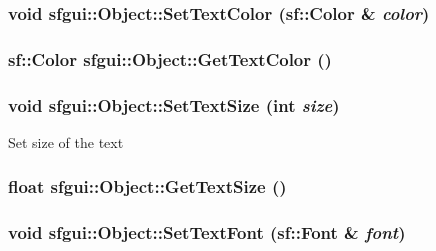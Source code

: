 \hypertarget{classsfgui_1_1Object_88f1c97f50dd466417309f0776dce452}{
\subsubsection[SetTextColor]{\setlength{\rightskip}{0pt plus 5cm}void sfgui::Object::SetTextColor (sf::Color \& {\em color})}}
\label{classsfgui_1_1Object_88f1c97f50dd466417309f0776dce452}


\hypertarget{classsfgui_1_1Object_df734af2a7ca4ad600fe8bff51ed06cc}{
\subsubsection[GetTextColor]{\setlength{\rightskip}{0pt plus 5cm}sf::Color sfgui::Object::GetTextColor ()}}
\label{classsfgui_1_1Object_df734af2a7ca4ad600fe8bff51ed06cc}


\hypertarget{classsfgui_1_1Object_6aba72276a557c90fef974478e88a04d}{
\subsubsection[SetTextSize]{\setlength{\rightskip}{0pt plus 5cm}void sfgui::Object::SetTextSize (int {\em size})}}
\label{classsfgui_1_1Object_6aba72276a557c90fef974478e88a04d}




Set size of the text \hypertarget{classsfgui_1_1Object_a6fae4cfa68982563c49b8b13b11966b}{
\subsubsection[GetTextSize]{\setlength{\rightskip}{0pt plus 5cm}float sfgui::Object::GetTextSize ()}}
\label{classsfgui_1_1Object_a6fae4cfa68982563c49b8b13b11966b}


\hypertarget{classsfgui_1_1Object_41801231361e4866d99ce7d4ef32e53d}{
\subsubsection[SetTextFont]{\setlength{\rightskip}{0pt plus 5cm}void sfgui::Object::SetTextFont (sf::Font \& {\em font})}}
\label{classsfgui_1_1Object_41801231361e4866d99ce7d4ef32e53d}




